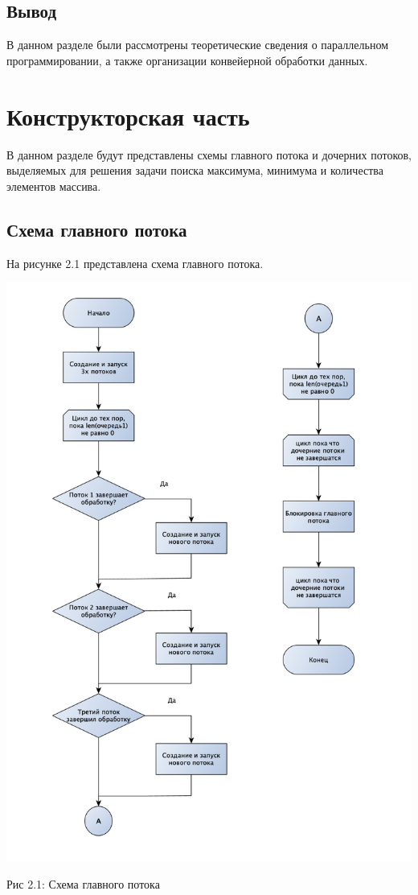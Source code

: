 \documentclass[12pt]{report}
\begin{document}
\section{Вывод}

В данном разделе были рассмотрены теоретические сведения о параллельном программировании, а также организации конвейерной обработки данных.
 
\chapter{Конструкторская часть}

В данном разделе будут представлены схемы главного потока и дочерних потоков, выделяемых для решения задачи поиска максимума, минимума и количества элементов массива.

\section{Схема главного потока}

На рисунке 2.1 представлена схема главного потока.

\begin{center}
		\includegraphics[scale=0.6]{MainThread.png}
		
			Рис 2.1: Схема главного потока
\end{center}
\end{document}
